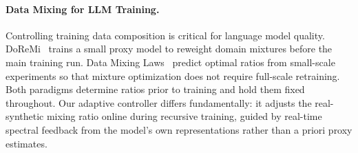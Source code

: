\paragraph{Data Mixing for LLM Training.}
Controlling training data composition is critical for language model quality.
DoReMi~\cite{xie2023doremi} trains a small proxy model to reweight domain mixtures before the main training run.
Data Mixing Laws~\cite{ye2025mixinglaws, data_mixing_laws2024} predict optimal ratios from small-scale experiments so that mixture optimization does not require full-scale retraining.
Both paradigms determine ratios prior to training and hold them fixed throughout.
Our adaptive controller differs fundamentally: it adjusts the real-synthetic mixing ratio online during recursive training, guided by real-time spectral feedback from the model's own representations rather than a priori proxy estimates.